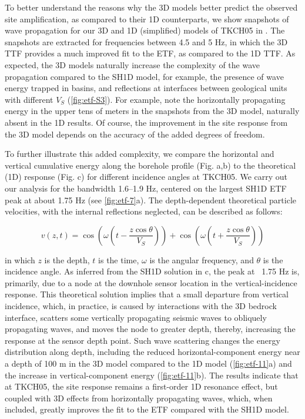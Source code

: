To better understand the reasons why the 3D models better predict the observed site amplification, as compared to their 1D counterparts, we show snapshots of wave propagation for our 3D and 1D (simplified) models of TKCH05 in . The snapshots are extracted for frequencies between 4.5 and 5 Hz, in which the 3D TTF provides a much improved fit to the ETF, as compared to the 1D TTF. As expected, the 3D models naturally increase the complexity of the wave propagation compared to the SH1D model, for example, the presence of wave energy trapped in basins, and reflections at interfaces between geological units with different $V_S$ (\cref{fig:etf-S3}). For example, note the horizontally propagating energy in the upper tens of meters in the snapshots from the 3D model, naturally absent in the 1D results. Of course, the improvement in the site response from the 3D model depends on the accuracy of the added degrees of freedom.

To further illustrate this added complexity, we compare the horizontal and vertical cumulative energy along the borehole profile (Fig. a,b) to the theoretical (1D) response (Fig. c) for different incidence angles at TKCH05. We carry out our analysis for the bandwidth 1.6–1.9 Hz, centered on the largest SH1D ETF peak at about 1.75 Hz (see  \cref{fig:etf-7}a). The depth-dependent theoretical particle velocities, with the internal reflections neglected, can be described as follows:

\begin{equation}\label{eq:etf-6}
  v(z, t)=\cos \left(\omega\left(t-\frac{z \cos \theta}{V_{S}}\right)\right)+\cos \left(\omega\left(t+\frac{z \cos \theta}{V_{S}}\right)\right)
\end{equation}

\noindent in which $z$ is the depth, $t$ is the time, $\omega$ is the angular frequency, and $\theta$ is the incidence angle. As inferred from the SH1D solution in c, the peak at ~1.75 Hz is, primarily, due to a node at the downhole sensor location in the vertical-incidence response. This theoretical solution implies that a small departure from vertical incidence, which, in practice, is caused by interactions with the 3D bedrock interface, scatters some vertically propagating seismic waves to obliquely propagating waves, and moves the node to greater depth, thereby, increasing the response at the sensor depth point. Such wave scattering changes the energy distribution along depth, including the reduced horizontal-component energy near a depth of 100 m in the 3D model compared to the 1D model (\cref{fig:etf-11}a) and the increase in vertical-component energy (\cref{fig:etf-11}b). The results indicate that at TKCH05, the site response remains a first-order 1D resonance effect, but coupled with 3D effects from horizontally propagating waves, which, when included, greatly improves the fit to the ETF compared with the SH1D model.


